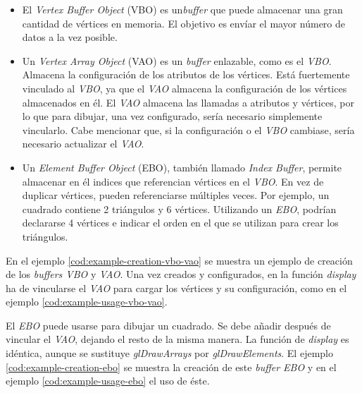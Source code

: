 \begin{itemize}
    \item El \textit{Vertex Buffer Object} (VBO) es un\textit{buffer} que puede almacenar una gran cantidad de vértices en memoria. El objetivo es envíar el mayor número de datos a la vez posible.

    \item Un \textit{Vertex Array Object} (VAO) es un \textit{buffer} enlazable, como es el \textit{VBO}. Almacena la configuración de los atributos de los vértices. Está fuertemente vinculado al \textit{VBO}, ya que el \textit{VAO} almacena la configuración de los vértices almacenados en él. El \textit{VAO} almacena las llamadas a atributos y vértices, por lo que para dibujar, una vez configurado, sería necesario simplemente vincularlo. Cabe mencionar que, si la configuración o el \textit{VBO} cambiase, sería necesario actualizar el \textit{VAO}.

    \item Un \textit{Element Buffer Object} (EBO), también llamado \textit{Index Buffer}, permite almacenar en él indices que referencian vértices en el \textit{VBO}. En vez de duplicar vértices, pueden referenciarse múltiples veces. Por ejemplo, un cuadrado contiene 2 triángulos y 6 vértices. Utilizando un \textit{EBO}, podrían declararse 4 vértices e indicar el orden en el que se utilizan para crear los triángulos.
\end{itemize}

En el ejemplo \ref{cod:example-creation-vbo-vao} se muestra un ejemplo de creación de los \textit{buffers VBO} y \textit{VAO}. Una vez creados y configurados, en la función \textit{display} ha de vincularse el \textit{VAO} para cargar los vértices y su configuración, como en el ejemplo \ref{cod:example-usage-vbo-vao}.




\FloatBarrier

El \textit{EBO} puede usarse para dibujar un cuadrado. Se debe añadir después de vincular el \textit{VAO}, dejando el resto de la misma manera. La función de \textit{display} es idéntica, aunque se sustituye \textit{glDrawArrays} por \textit{glDrawElements}. El ejemplo \ref{cod:example-creation-ebo} se muestra la creación de este \textit{buffer EBO} y en el ejemplo \ref{cod:example-usage-ebo} el uso de éste.

